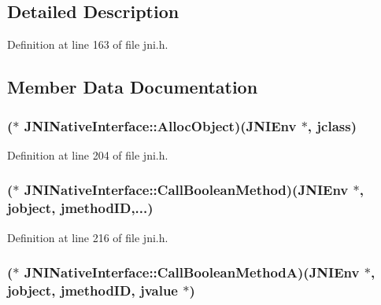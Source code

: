 \subsection{Detailed Description}


Definition at line 163 of file jni.\-h.



\subsection{Member Data Documentation}
\hypertarget{struct_j_n_i_native_interface_aaeaa7ae4982e2e4c0d5bc0ad8331ee0f}{
\subsubsection[{Alloc\-Object}]{($\ast$ J\-N\-I\-Native\-Interface\-::\-Alloc\-Object)({\bf J\-N\-I\-Env} $\ast$, {\bf jclass})}}\label{struct_j_n_i_native_interface_aaeaa7ae4982e2e4c0d5bc0ad8331ee0f}


Definition at line 204 of file jni.\-h.

\hypertarget{struct_j_n_i_native_interface_abaad179e9cd65286ccd52e04038ac308}{
\subsubsection[{Call\-Boolean\-Method}]{($\ast$ J\-N\-I\-Native\-Interface\-::\-Call\-Boolean\-Method)({\bf J\-N\-I\-Env} $\ast$, {\bf jobject}, {\bf jmethod\-I\-D},...)}}\label{struct_j_n_i_native_interface_abaad179e9cd65286ccd52e04038ac308}


Definition at line 216 of file jni.\-h.

\hypertarget{struct_j_n_i_native_interface_aef93189d96bbe05d6caad69c44df586e}{
\subsubsection[{Call\-Boolean\-Method\-A}]{($\ast$ J\-N\-I\-Native\-Interface\-::\-Call\-Boolean\-Method\-A)({\bf J\-N\-I\-Env} $\ast$, {\bf jobject}, {\bf jmethod\-I\-D}, {\bf jvalue} $\ast$)}}\label{struct_j_n_i_native_interface_aef93189d96bbe05d6caad69c44df586e}


